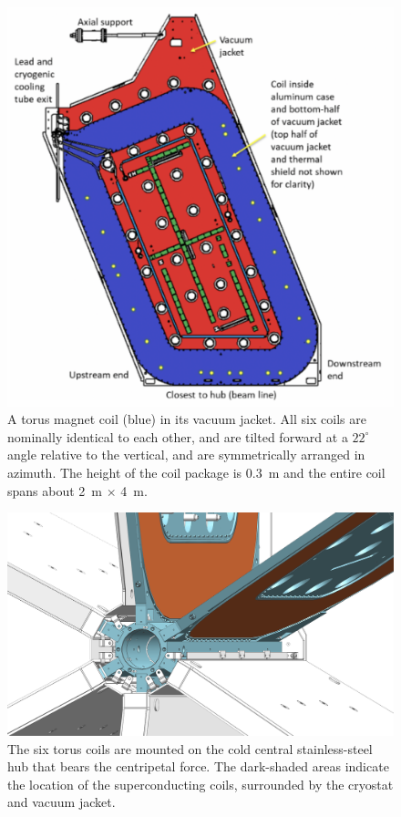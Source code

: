\documentclass[final,3p,twocolumn]{elsarticle}
\begin{document}
\begin{figure}[th!]
\centerline{\includegraphics[width=1.0\columnwidth]{Torus-coil.png}}
\caption{A torus magnet coil (blue) in its vacuum jacket. All six coils are nominally identical to each other, and are
  tilted forward at a $22^\circ$ angle relative to the vertical, and are symmetrically arranged in azimuth. The height
  of the coil package is 0.3~m and the entire coil spans about 2~m $\times$ 4~m.}
\label{coil-shape}
\end{figure}

\begin{figure}[th!]
\centerline{\includegraphics[width=1.00\columnwidth]{torus-hub-2.png}}
\caption{The six torus coils are mounted on the cold central stainless-steel hub that bears the centripetal force. The
dark-shaded areas indicate the location of the superconducting coils, surrounded by the cryostat and vacuum jacket.}
\label{coil-mount}
\end{figure}
\end{document}
